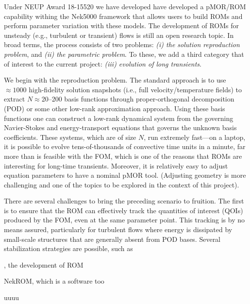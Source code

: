 Under NEUP Award 18-15520 we have developed have developed a pMOR/ROM
capability withing the Nek5000 framework that allows users to build ROMs and
perform parameter variation with these models.  The development of ROMs for
unsteady (e.g., turbulent or transient) flows is still an open research topic.
In broad terms, the process consists of two problems: {\em (i) the solution
reproduction problem}, and {\em (ii) the parametric problem}.  To these, we add
a third category that of interest to the current project: {\em (iii) evolution
of long transients}.

We begin with the reproduction problem. The standard approach is to use
$\approx 1000$ high-fidelity solution snapshots (i.e., full velocity/temperature
fields) to extract $N$$\approx$20--200 basis functions through 
proper-orthogonal decomposition (POD) or some other low-rank approximation
approach.  Using these basis functions one can construct a low-rank
dynamical system from the governing Navier-Stokes and energy-transport
equations that governs the unknown basis coefficients.  These systems,
which are of size $N$, run extremely fast---on a laptop, it is possible
to evolve tens-of-thousands of convective time units in a minute, far more than
is feasible with the FOM, which is one of the reasons that ROMs are interesting
for long-time transients.  Moreover, it is relatively easy to adjust equation
parameters to have a nominal pMOR tool.  (Adjusting geometry is more
challenging and one of the topics to be explored in the context of this
project).

There are several challenges to bring the preceding scenario to fruition.
The first is to ensure that the ROM can effectively track the quantities
of interest (QOIs) produced by the FOM, even at the same parameter point.
This tracking is by no means assured, particularly for turbulent flows
where energy is dissipated by small-scale structures that are generally
absent from POD bases.  Several stabilization strategies are possible,
such as 












, the development of ROM








NekROM, which is a software
too

uuuu


